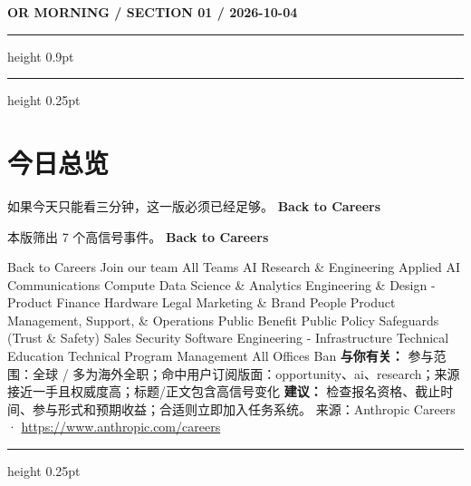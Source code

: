 \documentclass[10.5pt]{ctexart}
\begin{document}
{\small\bfseries OR MORNING / SECTION 01 / 2026-10-04}
\vspace{2mm}
\hrule height 0.9pt
\vspace{1.5mm}
\hrule height 0.25pt
\vspace{4mm}
\section*{今日总览}
{\color{ormuted} 如果今天只能看三分钟，这一版必须已经足够。}
\vspace{2mm}
{\fontsize{25}{29}\selectfont\bfseries Back to Careers}\par
\vspace{2mm}
{\large 本版筛出 7 个高信号事件。}
\vspace{3mm}
{\Large\bfseries Back to Careers}\par
Back to Careers Join our team All Teams AI Research \& Engineering Applied AI Communications Compute Data Science \& Analytics Engineering \& Design - Product Finance Hardware Legal Marketing \& Brand People Product Management, Support, \& Operations Public Benefit Public Policy Safeguards (Trust \& Safety) Sales Security Software Engineering - Infrastructure Technical Education Technical Program Management All Offices Ban
\textbf{与你有关：} 参与范围：全球 / 多为海外全职；命中用户订阅版面：opportunity、ai、research；来源接近一手且权威度高；标题/正文包含高信号变化
\textbf{建议：} 检查报名资格、截止时间、参与形式和预期收益；合适则立即加入任务系统。
{\footnotesize\color{ormuted} 来源：Anthropic Careers · \url{https://www.anthropic.com/careers}}
\vspace{3mm}
\hrule height 0.25pt
\vspace{3mm}
\end{document}
